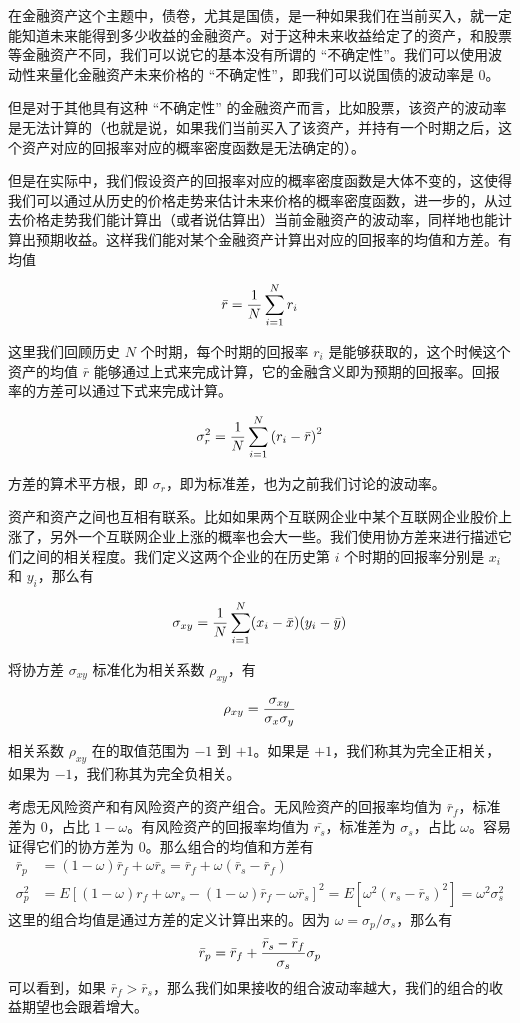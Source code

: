 \documentclass[utf8,a4paper,nofonts,9pt]{ctexbook}
\begin{document}
在金融资产这个主题中，债卷，尤其是国债，是一种如果我们在当前买入，就一定能知道未来能得到多少收益的金融资产。对于这种未来收益给定了的资产，和股票等金融资产不同，我们可以说它的基本没有所谓的 “不确定性”。我们可以使用波动性来量化金融资产未来价格的 “不确定性”，即我们可以说国债的波动率是 0。

但是对于其他具有这种 “不确定性” 的金融资产而言，比如股票，该资产的波动率是无法计算的（也就是说，如果我们当前买入了该资产，并持有一个时期之后，这个资产对应的回报率对应的概率密度函数是无法确定的）。

但是在实际中，我们假设资产的回报率对应的概率密度函数是大体不变的，这使得我们可以通过从历史的价格走势来估计未来价格的概率密度函数，进一步的，从过去价格走势我们能计算出（或者说估算出）当前金融资产的波动率，同样地也能计算出预期收益。这样我们能对某个金融资产计算出对应的回报率的均值和方差。有均值

$$
\bar{r} = {1 \over N}\sum_{i = 1}^{N} r_i
$$

这里我们回顾历史 $N$ 个时期，每个时期的回报率 $r_i$ 是能够获取的，这个时候这个资产的均值 $\bar{r}$ 能够通过上式来完成计算，它的金融含义即为预期的回报率。回报率的方差可以通过下式来完成计算。

$$
\sigma_r^2 = {1 \over N}\sum_{i = 1}^{N} \left( r_i - \bar{r} \right)^2
$$

方差的算术平方根，即 $\sigma_r$，即为标准差，也为之前我们讨论的波动率。

资产和资产之间也互相有联系。比如如果两个互联网企业中某个互联网企业股价上涨了，另外一个互联网企业上涨的概率也会大一些。我们使用协方差来进行描述它们之间的相关程度。我们定义这两个企业的在历史第 $i$ 个时期的回报率分别是 $x_i$ 和 $y_i$，那么有

$$
\sigma_{xy} = {1 \over N} \sum_{i = 1}^{N} (x_i - \bar{x}) (y_i - \bar{y})
$$

将协方差 $\sigma_{xy}$ 标准化为相关系数 $\rho_{xy}$，有

$$
\rho_{xy} = {\sigma_{xy} \over \sigma_x \sigma_y}
$$

相关系数 $\rho_{xy}$ 在的取值范围为 $-1$ 到 $+1$。如果是 $+1$，我们称其为完全正相关，如果为 $-1$，我们称其为完全负相关。

考虑无风险资产和有风险资产的资产组合。无风险资产的回报率均值为 $\bar{r}_f$，标准差为 $0$，占比 $1 - \omega$。有风险资产的回报率均值为 $\bar{r_s}$，标准差为 $\sigma_s$，占比 $\omega$。容易证得它们的协方差为 $0$。那么组合的均值和方差有
\begin{align*}
    \bar{r}_p  & = (1 - \omega) \bar{r}_f + \omega \bar{r}_s = \bar{r}_f + \omega(\bar{r}_s - \bar{r}_f) \\
    \sigma_p^2 & = E\left[ (1 - \omega) r_f + \omega r_s - (1 - \omega) \bar{r}_f - \omega \bar{r}_s \right]^2 = E\left[ \omega^2 (r_s - \bar{r}_s)^2 \right] = \omega^2 \sigma_s^2
\end{align*}
这里的组合均值是通过方差的定义计算出来的。因为 $\omega = \sigma_p / \sigma_s$，那么有
\[
    \bar{r}_p = \bar{r}_f + {\bar{r}_s - \bar{r}_f \over \sigma_s} \sigma_p
\]
可以看到，如果 $\bar{r}_f > \bar{r}_s$，那么我们如果接收的组合波动率越大，我们的组合的收益期望也会跟着增大。
\end{document}
